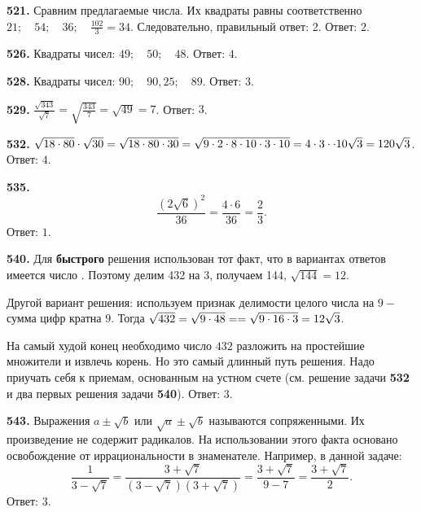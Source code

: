 \textbf{521.}  Сравним  предлагаемые  числа. Их квадраты  равны соответственно $21;\quad 54;\quad 36;\quad \frac{102}{3}=34$. Следовательно, правильный ответ: 2. \newline \null \hspace*{\fill} Ответ: $2$. 

\textbf{526.} Квадраты чисел: $49;\quad 50;\quad 48$. \newline \null \hspace*{\fill} Ответ: $4$. 

\textbf{528.} Квадраты чисел: $90;\quad90,25;\quad89$. \newline \null \hspace*{\fill} Ответ: $3$. 

\textbf{529.} $\frac{\sqrt{343}}{\sqrt{7}}=\sqrt{\frac{343}{7}}=\sqrt{49}=7$. \newline \null \hspace*{\fill} Ответ: $3$. 

\textbf{532.} $\sqrt{18\cdot80}\cdot\sqrt{30}=\sqrt{18\cdot80\cdot30}=\sqrt{9\cdot2\cdot8\cdot10\cdot3\cdot10}=4\cdot3\cdot\linebreak\cdot10\sqrt{3}=120\sqrt{3}$. \newline \null \hspace*{\fill} Ответ: $4$. 

\textbf{535.} $$\frac{\left(2\sqrt{6}\right)^2}{36}=\frac{4\cdot6}{36}=\frac{2}{3}.$$ \newline \null \hspace*{\fill} Ответ: $1$.

\textbf{540.} Для \textbf{быстрого} решения  использован тот факт, что в вариантах ответов имеется число . Поэтому делим 432 на 3, получаем 144, $\sqrt{144}=12$.    

Другой вариант решения: используем признак делимости целого числа на $9- $сумма цифр кратна $9$. Тогда $\sqrt{432}=\sqrt{9\cdot48}=\linebreak=\sqrt{9\cdot16\cdot3}=12\sqrt{3}$.
 
На самый худой конец необходимо число $432$ разложить на простейшие множители и извлечь корень. Но это самый длинный путь решения. Надо приучать себя к приемам, основанным на устном счете (см. решение  задачи  \textbf{532} и два первых решения задачи  \textbf{540}). \newline \null \hspace*{\fill} Ответ: $3$. 

\textbf{543.} Выражения $a\pm\sqrt{b}$ или $\sqrt{a}\pm\sqrt{b}$ называются сопряженными. Их произведение не содержит радикалов. На использовании этого факта основано освобождение от иррациональности в знаменателе. Например, в данной задаче: $$\frac{1}{3-\sqrt{7}}=\frac{3+\sqrt{7}}{\left(3-\sqrt{7}\right)\left(3+\sqrt{7}\right)}=\frac{3+\sqrt{7}}{9-7}=\frac{3+\sqrt{7}}{2}.$$ \newline \null \hspace*{\fill} Ответ: $3$.

